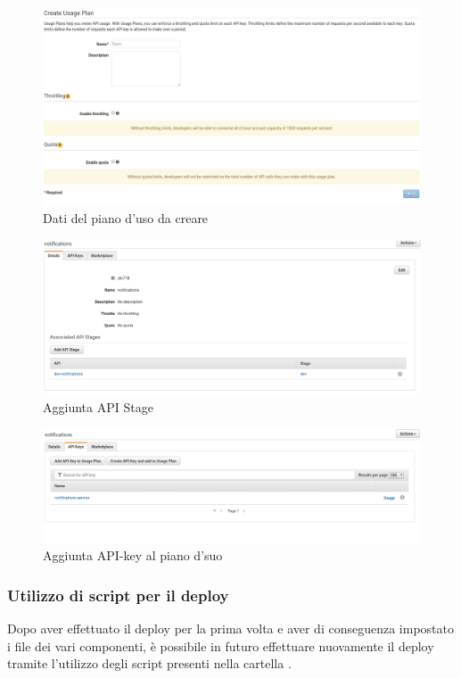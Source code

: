 \begin{figure}[H]
	\centerline{\includegraphics[width=1\textwidth,height=\textheight,keepaspectratio]{sezioni/images/Apidata.png}}
	\caption{Dati del piano d'uso da creare}\label{fig:apidata}
\end{figure}
\begin{figure}[H]
	\centerline{\includegraphics[width=1\textwidth,height=\textheight,keepaspectratio]{sezioni/images/addapistage.png}}
	\caption{Aggiunta API Stage}\label{fig:apistage}
\end{figure}
\begin{figure}[H]
	\centerline{\includegraphics[width=1\textwidth,height=\textheight,keepaspectratio]{sezioni/images/addapikey.png}}
	\caption{Aggiunta API-key al piano d'suo}\label{fig:apikey}
\end{figure}

\subsubsection{Utilizzo di script per il deploy}
Dopo aver effettuato il deploy per la prima volta e aver di conseguenza impostato i file  dei vari componenti, è possibile in futuro effettuare nuovamente il deploy tramite l'utilizzo degli script presenti nella cartella .


